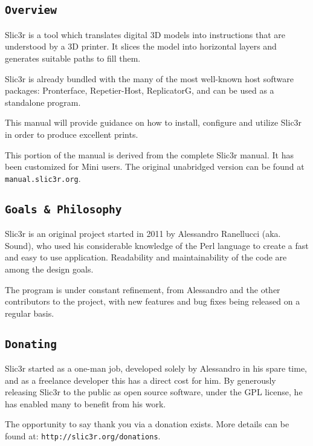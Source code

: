 
\subsection{\texttt{Overview}} %
\label{sec:overview}

Slic3r is a tool which translates digital 3D models into instructions that are understood by a 3D printer.  It slices the model into horizontal layers and generates suitable paths to fill them.

Slic3r is already bundled with the many of the most well-known host software packages: Pronterface, Repetier-Host, ReplicatorG, and can be used as a standalone program.

This manual will provide guidance on how to install, configure and utilize Slic3r in order to produce excellent prints.

This portion of the manual is derived from the complete Slic3r manual. It has been customized for Mini users. The original unabridged version can be found at \texttt{manual.slic3r.org}.



\subsection{\texttt{Goals \& Philosophy}} %
\label{sec:goals_philosophy}

Slic3r is an original project started in 2011 by Alessandro Ranellucci (aka. Sound), who used his considerable knowledge of the Perl language to create a fast and easy to use application.  Readability and maintainability of the code are among the design goals.

The program is under constant refinement, from Alessandro and the other contributors to the project, with new features and bug fixes being released on a regular basis.



\subsection{\texttt{Donating}} %
\label{sec:donating}

Slic3r started as a one-man job, developed solely by Alessandro in his spare time, and as a freelance developer this has a direct cost for him.  By generously releasing Slic3r to the public as open source software, under the GPL license, he has enabled many to benefit from his work.

The opportunity to say thank you via a donation exists.  More details can be found at: \texttt{http://slic3r.org/donations}.


